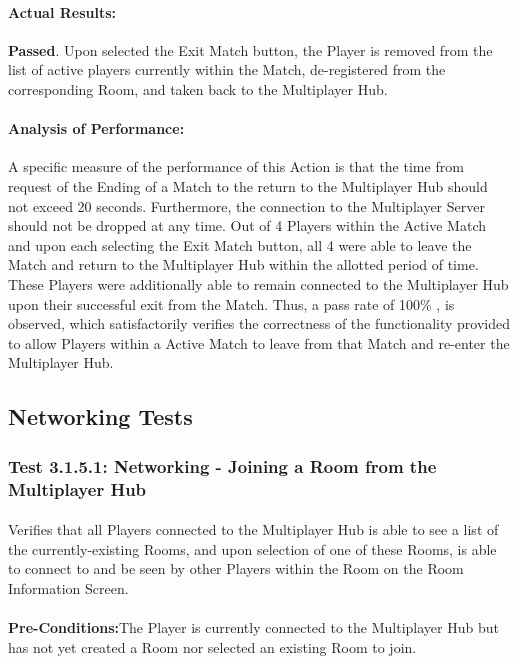 \documentclass{article}
\begin{document}
    \paragraph{Actual Results:} \textbf{Passed}. Upon selected the Exit Match button, the Player is removed from the list of active players currently within the Match, de-registered from the corresponding Room, and taken back to the Multiplayer Hub.
    \paragraph{Analysis of Performance:} A specific measure of the performance of this Action is that the time from request of the Ending of a Match to the return to the Multiplayer Hub should not exceed 20 seconds. Furthermore, the connection to the Multiplayer Server should not be dropped at any time. Out of 4 Players within the Active Match and upon each selecting the Exit Match button, all 4 were able to leave the Match and return to the Multiplayer Hub within the allotted period of time. These Players were additionally able to remain connected to the Multiplayer Hub upon their successful exit from the Match.  Thus, a pass rate of 100\% , is observed, which satisfactorily verifies the correctness of the functionality provided to allow Players within a Active Match to leave from that Match and re-enter the Multiplayer Hub.
    
    \subsection{Networking Tests}
     \subsubsection{Test 3.1.5.1: Networking - Joining a Room from the Multiplayer Hub}
    \paragraph{} Verifies that all Players connected to the Multiplayer Hub is able to see a list of the currently-existing Rooms, and upon selection of one of these Rooms, is able to connect to and be seen by other Players within the Room on the Room Information Screen.
    \paragraph{}\textbf{Pre-Conditions:}The Player is currently connected to the Multiplayer Hub but has not yet created a Room nor selected an existing Room to join.
\end{document}
